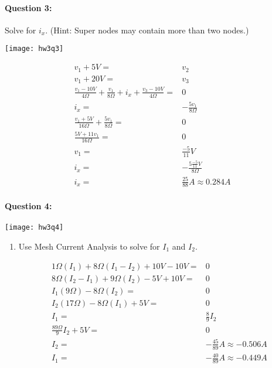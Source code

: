 \documentclass[12pt,letterpaper,titlepage]{article}
\begin{document}
\begin{raggedright}
\clearpage

\paragraph{Question 3: }

Solve for $i_x$. (Hint: Super nodes may contain more than two nodes.)

\begin{center}
\texttt{[image: hw3q3]}
\end{center}

\begin{align*}
    v_1 + 5V=& v_2
\\  v_1 + 20V=& v_3
\\  \frac{v_1 - 10V}{4\Omega} + \frac{v_1}{8\Omega} + i_x + \frac{v_3-10V}{4\Omega}=& 0
\\  i_x=& -\frac{5v_1}{8\Omega}
\\  \frac{v_1+5V}{16\Omega} + \frac{5v_1}{8\Omega} =& 0
\\  \frac{5V + 11v_1}{16\Omega} =& 0
\\  v_1 =& \frac{-5}{11}V
\\  i_x=& -\frac{5\frac{-5}{11}V}{8\Omega}
\\  i_x=& \frac{25}{88}A \approx 0.284A
\end{align*}

\clearpage

\paragraph{Question 4: }

\begin{center}
\texttt{[image: hw3q4]}
\end{center}

\begin{enumerate}[label=\Alph*)]
\item Use Mesh Current Analysis to solve for $I_1$ and $I_2$.

\begin{align*}
    1\Omega(I_1) + 8\Omega(I_1-I_2) + 10V - 10V =& 0
\\  8\Omega(I_2-I_1) + 9\Omega(I_2) - 5V + 10V =& 0
\\  I_1(9\Omega)-8\Omega(I_2) =& 0
\\  I_2(17\Omega) - 8\Omega(I_1) + 5V =& 0
\\  I_1 =& \frac{8}{9}I_2
\\  \frac{89\Omega}{9}I_2 + 5V =& 0
\\  I_2 =& -\frac{45}{89}A \approx -0.506A
\\  I_1 =& -\frac{40}{89}A \approx -0.449A
\end{align*}


\end{enumerate}
\end{raggedright}
\end{document}

